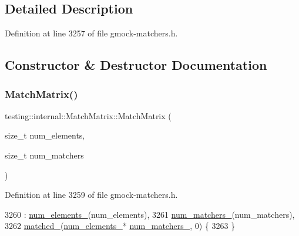\subsection{Detailed Description}


Definition at line 3257 of file gmock-\/matchers.\+h.



\subsection{Constructor \& Destructor Documentation}
\mbox{\label{classtesting_1_1internal_1_1MatchMatrix_afa3313976a69b2a954b2f8b8840c37bb}} 
\subsubsection{\texorpdfstring{Match\+Matrix()}{MatchMatrix()}}
{\footnotesize\ttfamily testing\+::internal\+::\+Match\+Matrix\+::\+Match\+Matrix (\begin{DoxyParamCaption}\item[{size\+\_\+t}]{num\+\_\+elements,  }\item[{size\+\_\+t}]{num\+\_\+matchers }\end{DoxyParamCaption})\hspace{0.3cm}{\ttfamily [inline]}}



Definition at line 3259 of file gmock-\/matchers.\+h.


\begin{DoxyCode}
3260       : \hyperlink{classtesting_1_1internal_1_1MatchMatrix_a9e4eb268fa140a516390631cddc681db}{num\_elements\_}(num\_elements),
3261         \hyperlink{classtesting_1_1internal_1_1MatchMatrix_aa89a05c387a88844fd30f03d1a24ce35}{num\_matchers\_}(num\_matchers),
3262         \hyperlink{classtesting_1_1internal_1_1MatchMatrix_ae01ec0d94b7812559acfcf84f10707e2}{matched\_}(\hyperlink{classtesting_1_1internal_1_1MatchMatrix_a9e4eb268fa140a516390631cddc681db}{num\_elements\_}* \hyperlink{classtesting_1_1internal_1_1MatchMatrix_aa89a05c387a88844fd30f03d1a24ce35}{num\_matchers\_}, 0) \{
3263   \}
\end{DoxyCode}


